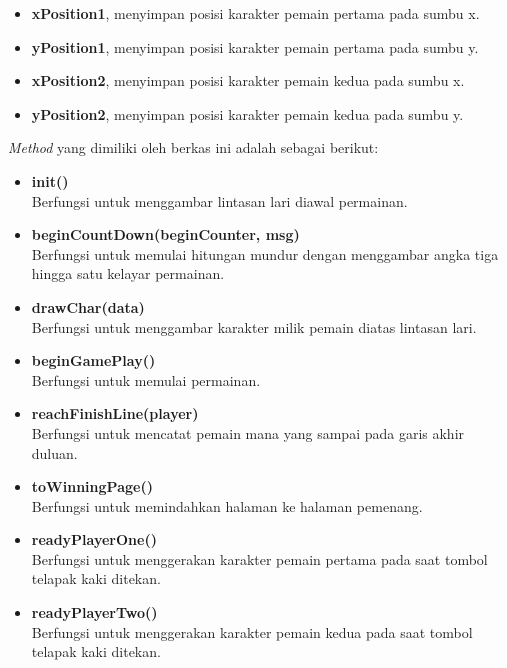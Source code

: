 \begin{enumerate}
\begin{enumerate}
\begin{enumerate}
\begin{itemize}
				\item \textbf{xPosition1}, menyimpan posisi karakter pemain pertama pada sumbu x.
				\item \textbf{yPosition1}, menyimpan posisi karakter pemain pertama pada sumbu y.
				\item \textbf{xPosition2}, menyimpan posisi karakter pemain kedua pada sumbu x.
				\item \textbf{yPosition2}, menyimpan posisi karakter pemain kedua pada sumbu y.
			\end{itemize}
			
			\textit{Method} yang dimiliki oleh berkas ini adalah sebagai berikut:
			\begin{itemize}
				\item \textbf{init()} \\
				Berfungsi untuk menggambar lintasan lari diawal permainan.
				
				\item \textbf{beginCountDown(beginCounter, msg)} \\
				Berfungsi untuk memulai hitungan mundur dengan menggambar angka tiga hingga satu kelayar permainan.
				
				\item \textbf{drawChar(data)} \\
				Berfungsi untuk menggambar karakter milik pemain diatas lintasan lari.
				
				\item \textbf{beginGamePlay()} \\
				Berfungsi untuk memulai permainan.
				
				\item \textbf{reachFinishLine(player)} \\
				Berfungsi untuk mencatat pemain mana yang sampai pada garis akhir duluan.
				
				\item \textbf{toWinningPage()} \\
				Berfungsi untuk memindahkan halaman ke halaman pemenang.
				
				\item \textbf{readyPlayerOne()} \\
				Berfungsi untuk menggerakan karakter pemain pertama pada saat tombol telapak kaki ditekan.
				
				\item \textbf{readyPlayerTwo()} \\
				Berfungsi untuk menggerakan karakter pemain kedua pada saat tombol telapak kaki ditekan.
			\end{itemize}
			

\end{enumerate}
\end{enumerate}
\end{enumerate}
